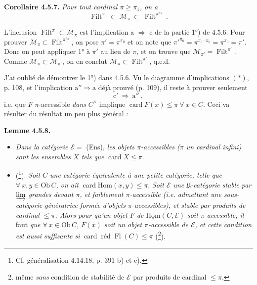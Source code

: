 \documentclass[11pt]{article}
\newcommand{\printedpage}[1]{\if\relax\detokenize{#1}\relax\else\marginpar{\footnotesize p.~#1}\fi}
\newcommand{\msp}[1]{\marginpar{\footnotesize [#1]}}
\newcommand{\uHom}{\underline{\mathrm{Hom}}}
\newcommand{\Hom}{\mathrm{Hom}}
\newcommand{\Ob}{\mathrm{Ob}\,}
\newcommand{\card}{\operatorname{card}}
\newcommand{\Fl}{\operatorname{Fl}}
\newcommand{\Filt}{\operatorname{Filt}}
\begin{document}
\textbf{Corollaire 4.5.7.} \textit{Pour tout cardinal $\pi \geqslant \pi_1$, on a}
\[
\Filt^\pi \ \subset \ \mathcal{M}_\pi \ \subset \ \Filt^{\pi^{\pi_0}} \ . \tag*{(4.5.7.1)}
\]

L'inclusion $\Filt^\pi \subset \mathcal{M}_\pi$ est l'implication a $\Longrightarrow$ c de la partie 1°) de 4.5.6. Pour prouver $\mathcal{M}_\pi \subset \Filt^{\pi^{\pi_0}}$, on pose $\pi' = \pi^{\pi_0}$ et on note que $\pi'^{\pi_0} = \pi^{\pi_0 \cdot \pi_0} = \pi^{\pi_0} = \pi'$. Donc on peut
\printedpage{35}
appliquer 1° à $\pi'$ au lieu de $\pi$, et on trouve que $\mathcal{M}_{\pi'} = \Filt^{\pi'}$. Comme $\mathcal{M}_\pi \subset \mathcal{M}_{\pi'}$, on en conclut $\mathcal{M}_\pi \subset \Filt^{\pi'}$, q.e.d.

J'ai oublié de démontrer le 1°) dans 4.5.6. Vu le diagramme d'implications $(\ast)$, p. 108, et l'implication $\mathrm{a}'' \Longrightarrow \mathrm{a}$ déjà prouvé (p. 109),
\msp{page 119}
il reste à prouver seulement
\[
\mathrm{c}' \ \Longrightarrow \ \mathrm{a}'' \ ,
\]
i.e. que $F$ $\pi$-accessible \textit{dans} $C^\wedge$ implique $\card F(x) \leqslant \pi \ \forall \ x \in C$. Ceci va résulter du résultat un peu plus général :

\textbf{Lemme 4.5.8.}
\begin{itemize}[leftmargin=3em]
\item[\textit{1°)}] \textit{Dans la catégorie $\mathcal{E} = $} (Ens), \textit{les objets $\pi$-accessibles ($\pi$ un cardinal infini) sont les ensembles $X$ tels que} $\card X \leqslant \pi$.
\item[\textit{2°)}] (\footnote{Cf. généralisation 4.14.18, p. 391 b) et c).}). \textit{Soit $C$ une catégorie équivalente à une petite catégorie, telle que $\forall \ x, y \in \Ob C$, on ait} $\card \Hom(x,y) \leqslant \pi$. \textit{Soit $\mathcal{E}$ une $\mathfrak{U}$-catégorie stable par $\varinjlim$ grandes devant $\pi$, et faiblement $\pi$-accessible (i.e. admettant une sous-catégorie génératrice formée d'objets $\pi$-accessibles), et stable par produits de cardinal $\leqslant \pi$. Alors pour qu'un objet $F$ de $\uHom(C,\mathcal{E})$ soit $\pi$-accessible, il} faut \textit{que $\forall \ x \in \Ob C$, $F(x)$ soit un objet $\pi$-accessible de $\mathcal{E}$, et cette condition est aussi suffisante si} $\card \operatorname{\text{réd}} \Fl(C) \leqslant \pi$ (\footnote{même \textit{sans} condition de stabilité de $\mathcal{E}$ par produits de cardinal $\leqslant \pi$.}).
\end{itemize}
\end{document}
